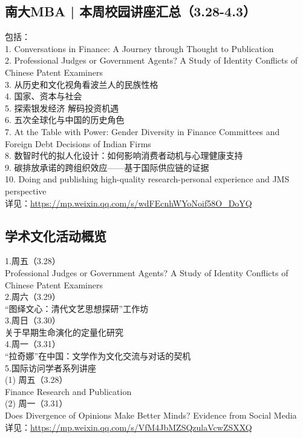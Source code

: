 \documentclass[letterpaper, 12pt]{article}
\begin{document}
\begin{multicols}{2}
\subsection{南大MBA | 本周校园讲座汇总（3.28-4.3）}
包括：
\\1. Conversations in Finance: A Journey through Thought to Publication
\\2. Professional Judges or Government Agents? A Study of Identity Conflicts of Chinese Patent Examiners
\\3. 从历史和文化视角看波兰人的民族性格
\\4. 国家、资本与社会
\\5. 探索银发经济 解码投资机遇
\\6. 五次全球化与中国的历史角色
\\7. At the Table with Power: Gender Diversity in Finance Committees and Foreign Debt Decisions of Indian Firms
\\8. 数智时代的拟人化设计：如何影响消费者动机与心理健康支持
\\9. 碳排放承诺的跨组织效应——基于国际供应链的证据
\\10. Doing and publishing high-quality research-personal experience and JMS perspective
\\详见：\url{https://mp.weixin.qq.com/s/wdFEcnhWYoNoif58O_DoYQ}

\subsection{学术文化活动概览}
1.周五（3.28）
\\Professional Judges or Government Agents? A Study of Identity Conflicts of Chinese Patent Examiners
\\2.周六（3.29）
\\“图绎文心：清代文艺思想探研”工作坊
\\3.周日（3.30）
\\关于早期生命演化的定量化研究
\\4.周一（3.31）
\\“拉奇娜”在中国：文学作为文化交流与对话的契机
\\5.国际访问学者系列讲座
\\(1) 周五（3.28）
\\Finance Research and Publication
\\(2) 周一（3.31）
\\Does Divergence of Opinions Make Better Minds? Evidence from Social Media
\\详见：\url{https://mp.weixin.qq.com/s/VfM4JbMZSQzulaVcwZSXXQ}



\end{multicols}
\end{document}
